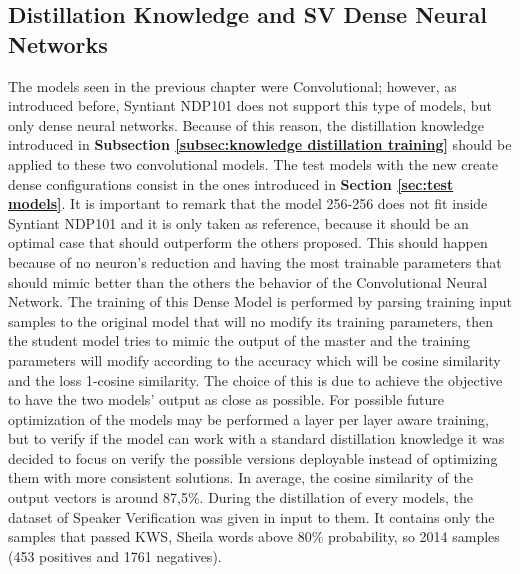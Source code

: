 \subsection{Distillation Knowledge and SV Dense Neural Networks}
\label{sec:distillation knowledge and sv dense neural networks}
The models seen in the previous chapter were Convolutional; however, as introduced before, Syntiant NDP101 does not support this type of models, but only dense neural networks. Because of this reason, the distillation knowledge introduced in \textbf{Subsection \ref{subsec:knowledge distillation training}} should be applied to these two convolutional models. The test models with the new create dense configurations consist in the ones introduced in \textbf{Section \ref{sec:test models}}. It is important to remark that the model 256-256 does not fit inside Syntiant NDP101 and it is only taken as reference, because it should be an optimal case that should outperform the others proposed. This should happen because of no neuron's reduction and having the most trainable parameters that should mimic better than the others the behavior of the Convolutional Neural Network.
The training of this Dense Model is performed by parsing training input samples to the original model that will no modify its training parameters, then the student model tries to mimic the output of the master and the training parameters will modify according to the accuracy which will be cosine similarity and the loss 1-cosine similarity. The choice of this is due to achieve the objective to have the two models' output as close as possible. For possible future optimization of the models may be performed a layer per layer aware training, but to verify if the model can work with a standard distillation knowledge it was decided to focus on verify the possible versions deployable instead of optimizing them with more consistent solutions. In average, the cosine similarity of the output vectors is around 87,5\%. During the distillation of every models, the dataset of Speaker Verification was given in input to them. It contains only the samples that passed KWS, Sheila words above 80\% probability, so 2014 samples (453 positives and 1761 negatives). 
